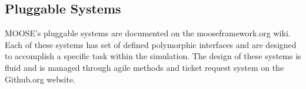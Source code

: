 \documentclass{INLreport}
\begin{document}
\subsection{Pluggable Systems}
MOOSE's pluggable systems are documented on the mooseframework.org wiki. Each of these systems has set of defined polymorphic interfaces and are designed to accomplish a specific task within the simulation. The design of these systems is fluid and is managed through agile methods and ticket request system on the Github.org website.
\end{document}
